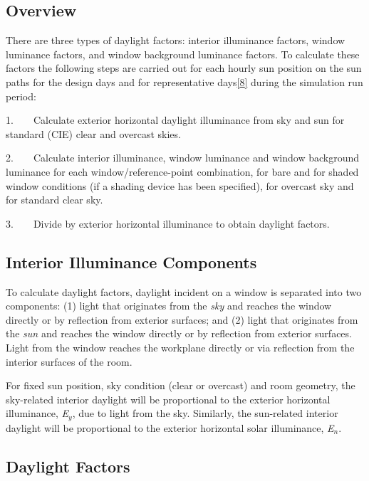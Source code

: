 \subsection{Overview}\label{overview-013}

There are three types of daylight factors: interior illuminance factors, window luminance factors, and window background luminance factors. To calculate these factors the following steps are carried out for each hourly sun position on the sun paths for the design days and for representative days\protect\hyperlink{ux5fftn8}{{[}8{]}} during the simulation run period:

1.~~~~Calculate exterior horizontal daylight illuminance from sky and sun for standard (CIE) clear and overcast skies.

2.~~~~Calculate interior illuminance, window luminance and window background luminance for each window/reference-point combination, for bare and for shaded window conditions (if a shading device has been specified), for overcast sky and for standard clear sky.

3.~~~~Divide by exterior horizontal illuminance to obtain daylight factors.

\subsection{Interior Illuminance Components}\label{interior-illuminance-components}

To calculate daylight factors, daylight incident on a window is separated into two components: (1) light that originates from the \emph{sky} and reaches the window directly or by reflection from exterior surfaces; and (2) light that originates from the \emph{sun} and reaches the window directly or by reflection from exterior surfaces. Light from the window reaches the workplane directly or via reflection from the interior surfaces of the room.

For fixed sun position, sky condition (clear or overcast) and room geometry, the sky-related interior daylight will be proportional to the exterior horizontal illuminance, \emph{E\(_{y}\)}, due to light from the sky. Similarly, the sun-related interior daylight will be proportional to the exterior horizontal solar illuminance, \emph{E\(_{n}\)}.

\subsection{Daylight Factors}\label{daylight-factors}

